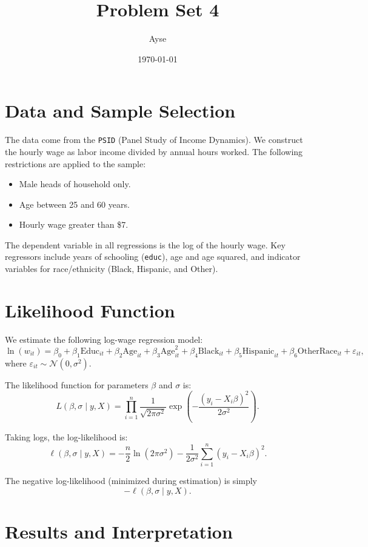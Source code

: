 \documentclass[12pt]{article}
\title{Problem Set 4}
\author{Ayse}
\date{\today}
\begin{document}
\maketitle

\section*{Data and Sample Selection}

The data come from the \texttt{PSID} (Panel Study of Income Dynamics).  
We construct the hourly wage as labor income divided by annual hours worked.  
The following restrictions are applied to the sample:
\begin{itemize}
  \item Male heads of household only.
  \item Age between 25 and 60 years.
  \item Hourly wage greater than \$7.
\end{itemize}

The dependent variable in all regressions is the log of the hourly wage.  
Key regressors include years of schooling (\texttt{educ}), age and age squared, and indicator variables for race/ethnicity (Black, Hispanic, and Other).

\section*{Likelihood Function}


We estimate the following log-wage regression model:
\[
\ln(w_{it}) 
= \beta_0 
+ \beta_1 \text{Educ}_{it} 
+ \beta_2 \text{Age}_{it} 
+ \beta_3 \text{Age}^2_{it} 
+ \beta_4 \text{Black}_{it} 
+ \beta_5 \text{Hispanic}_{it} 
+ \beta_6 \text{OtherRace}_{it} 
+ \varepsilon_{it},
\]
where $\varepsilon_{it} \sim \mathcal{N}(0, \sigma^2)$.

\bigskip


The likelihood function for parameters $\beta$ and $\sigma$ is:
\[
L(\beta, \sigma \mid y, X) 
= \prod_{i=1}^n \frac{1}{\sqrt{2 \pi \sigma^2}} 
  \exp\!\left( -\frac{(y_i - X_i \beta)^2}{2\sigma^2} \right).
\]

Taking logs, the log-likelihood is:
\[
\ell(\beta, \sigma \mid y, X) 
= -\frac{n}{2}\ln(2\pi\sigma^2) 
  - \frac{1}{2\sigma^2}\sum_{i=1}^n (y_i - X_i \beta)^2.
\]

The negative log-likelihood (minimized during estimation) is simply
\[
-\ell(\beta, \sigma \mid y, X).
\]


\section*{Results and Interpretation}
\end{document}

